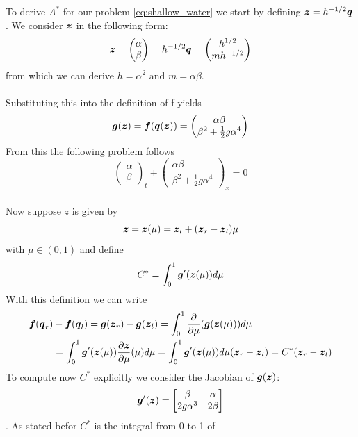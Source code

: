 \documentclass[oneside,12pt]{book}  %
\theoremstyle{plain}
\theoremstyle{definition}
\theoremstyle{remark}
\numberwithin{equation}{chapter} %
\begin{document}
To derive $A^*$ for our problem \ref{eq:shallow_water} we start by
defining ${\mbox{\boldmath$z$}}=h^{-1/2}{\mbox{\boldmath$q$}}$. We consider ${\mbox{\boldmath$z$}}$ in the following
form: $${\mbox{\boldmath$z$}}=\begin{pmatrix} \alpha \\ \beta \end{pmatrix}=h^{-1/2}{\mbox{\boldmath$q$}}=\begin{pmatrix} h^{1/2} \\ mh^{-1/2} \end{pmatrix} $$
from which we can derive $h=\alpha^2$ and $m=\alpha\beta$.
\\
\\
Substituting this into the definition of f yields
\begin{equation}
  \label{eq:roe_flux_z}
  {\mbox{\boldmath$g$}}({\mbox{\boldmath$z$}})={\mbox{\boldmath$f$}}({\mbox{\boldmath$q$}}({\mbox{\boldmath$z$}}))=\begin{pmatrix} \alpha\beta \\ \beta^2+\frac{1}{2}g\alpha^4 \end{pmatrix}
\end{equation}
From this the following problem follows
\begin{equation}
  \label{eq:shallow_water_z}
  \begin{pmatrix} \alpha \\ \beta \end{pmatrix}_t+\begin{pmatrix} \alpha\beta \\ \beta^2+\frac{1}{2}g\alpha^4 \end{pmatrix}_x=0
\end{equation}
\\
Now suppose $z$ is given by $${\mbox{\boldmath$z$}}={\mbox{\boldmath$z$}}(\mu)={\mbox{\boldmath$z$}}_l+({\mbox{\boldmath$z$}}_r-{\mbox{\boldmath$z$}}_l)\mu$$ with $\mu
\in (0,1)$ and define $$C^*=\int_0^1{\mbox{\boldmath$g$}}'({\mbox{\boldmath$z$}}(\mu))d\mu$$
With this definition we can write
\begin{equation}
\begin{split}
  {\mbox{\boldmath$f$}}({\mbox{\boldmath$q$}}_r)&-{\mbox{\boldmath$f$}}({\mbox{\boldmath$q$}}_l)={\mbox{\boldmath$g$}}({\mbox{\boldmath$z$}}_r)-{\mbox{\boldmath$g$}}({\mbox{\boldmath$z$}}_l)=\int_0^1\frac{\partial}{\partial
  \mu}({\mbox{\boldmath$g$}}({\mbox{\boldmath$z$}}(\mu)))d\mu \\
&=\int_0^1{\mbox{\boldmath$g$}}'({\mbox{\boldmath$z$}}(\mu))\frac{\partial
  {\mbox{\boldmath$z$}}}{\partial \mu}(\mu)d\mu
=\int_0^1{\mbox{\boldmath$g$}}'({\mbox{\boldmath$z$}}(\mu))d\mu({\mbox{\boldmath$z$}}_r-{\mbox{\boldmath$z$}}_l)=C^*({\mbox{\boldmath$z$}}_r-{\mbox{\boldmath$z$}}_l)
\end{split}
\end{equation}
To compute now $C^*$ explicitly we consider the Jacobian of
${\mbox{\boldmath$g$}}({\mbox{\boldmath$z$}})$: $${\mbox{\boldmath$g$}}'({\mbox{\boldmath$z$}})=\begin{bmatrix} \beta & \alpha \\ 2g\alpha^3
  & 2\beta \end{bmatrix}$$.
As stated befor $C^*$ is the integral from 0 to 1 of
\end{document}
